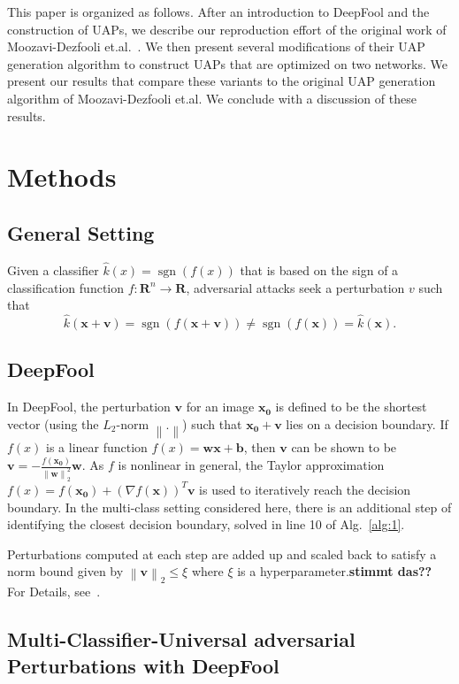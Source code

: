 \documentclass[runningheads]{llncs}
\DeclareMathOperator{\sgn}{sgn}
\newcommand{\xn}{\ensuremath{\mathbf{x_0}}}
\begin{document}
This paper is organized as follows. After an introduction to DeepFool and the construction of UAPs, we describe our reproduction effort of the original work of Moozavi-Dezfooli et.al.~\cite{moosavi-dezfooli_universal_2017}. We then present several modifications of their UAP generation algorithm to construct UAPs that are optimized on two networks. We present our results that compare these variants to the original UAP generation algorithm of Moozavi-Dezfooli et.al. We conclude with a discussion of these results.

\section{Methods}
\subsection{General Setting}
Given a classifier $\hat{k}(x)=\sgn\left(f(x)\right)$ that is based on the sign of a classification function $f:\mathbf{R}^n\rightarrow\mathbf{R}$, adversarial attacks seek a perturbation $v$ such that \[\hat{k}(\mathbf{x}+\mathbf{v})=\sgn\left(f(\mathbf{x}+\mathbf{v})\right)\neq \sgn\left(f(\mathbf{x})\right)=\hat{k}(\mathbf{x}).\] 


\subsection{DeepFool}
In DeepFool, the perturbation $\mathbf{v}$ for an image $\xn$ is defined to be the shortest vector (using the $L_2$-norm $\left\|.\right\|$) such that $\xn+\mathbf{v}$ lies on a decision boundary. 
If $f(x)$ is a linear function $f(x)=\mathbf{w} \mathbf{x}+\mathbf{b}$, then $\mathbf{v}$ can be shown to be $\mathbf{v}=-\frac{f(\xn)}{\left\|\mathbf{w}\right\|_2^2}\mathbf{w}$. As $f$ is nonlinear in general, the Taylor approximation $f(x)=f(\xn)+\left(\nabla f(\mathbf{x})\right)^T\mathbf{v}$ is used to iteratively reach the decision boundary. 
In the multi-class setting considered here, there is an additional step of identifying the closest decision boundary, solved in line 10 of Alg.~\ref{alg:1}.

Perturbations computed at each step are added up and scaled back to satisfy a norm bound given by \(\left\|\mathbf{v}\right\|_2\leq\xi\) where \(\xi\) is a hyperparameter.{\bf stimmt das??} For Details, see~\cite{DeepFool-Moosavi-Dezfooli15}. \\


\subsection{Multi-Classifier-Universal adversarial Perturbations with DeepFool}
\end{document}
